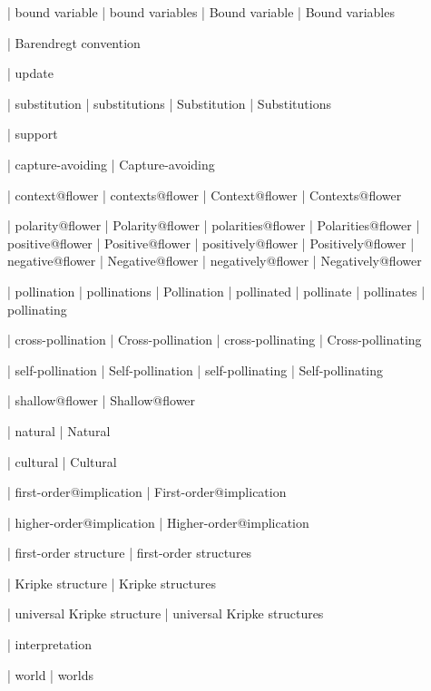  | bound variable
 | bound variables
 | Bound variable
 | Bound variables

 | Barendregt convention

 | update

 | substitution
 | substitutions
 | Substitution
 | Substitutions

 | support

 | capture-avoiding
 | Capture-avoiding

 | context@flower
 | contexts@flower
 | Context@flower
 | Contexts@flower

 | polarity@flower
 | Polarity@flower
 | polarities@flower
 | Polarities@flower
 | positive@flower
 | Positive@flower
 | positively@flower
 | Positively@flower
 | negative@flower
 | Negative@flower
 | negatively@flower
 | Negatively@flower

 | pollination
 | pollinations
 | Pollination
 | pollinated
 | pollinate
 | pollinates
 | pollinating

 | cross-pollination
 | Cross-pollination
 | cross-pollinating
 | Cross-pollinating

 | self-pollination
 | Self-pollination
 | self-pollinating
 | Self-pollinating

 | shallow@flower
 | Shallow@flower

 | natural
 | Natural

 | cultural
 | Cultural
 
 | first-order@implication
 | First-order@implication

 | higher-order@implication
 | Higher-order@implication

 | first-order structure
 | first-order structures

 | Kripke structure
 | Kripke structures

 | universal Kripke structure
 | universal Kripke structures

 | interpretation

 | world
 | worlds

